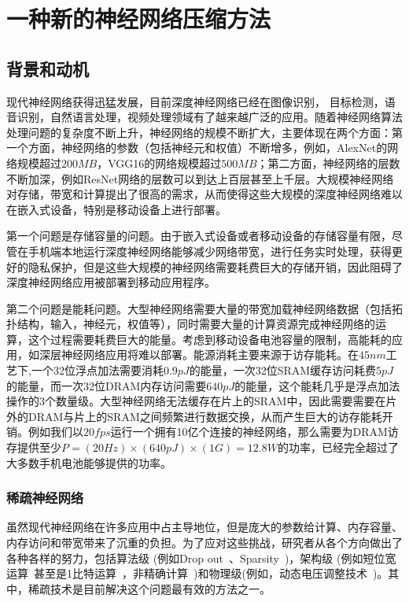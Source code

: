 \chapter{一种新的神经网络压缩方法}


\section{背景和动机}

现代神经网络获得迅猛发展，目前深度神经网络已经在图像识别， 目标检测，语音识别，自然语言处理，视频处理领域有了越来越广泛的应用。随着神经网络算法处理问题的复杂度不断上升，神经网络的规模不断扩大，主要体现在两个方面：第一个方面，神经网络的参数（包括神经元和权值）不断增多，例如，AlexNet的网络规模超过$200MB$，VGG16的网络规模超过$500MB$；第二方面，神经网络的层数不断加深，例如ResNet网络的层数可以到达上百层甚至上千层。大规模神经网络对存储，带宽和计算提出了很高的需求，从而使得这些大规模的深度神经网络难以在嵌入式设备，特别是移动设备上进行部署。

第一个问题是存储容量的问题。由于嵌入式设备或者移动设备的存储容量有限，尽管在手机端本地运行深度神经网络能够减少网络带宽，进行任务实时处理，获得更好的隐私保护，但是这些大规模的神经网络需要耗费巨大的存储开销，因此阻碍了深度神经网络应用被部署到移动应用程序。

第二个问题是能耗问题。大型神经网络需要大量的带宽加载神经网络数据（包括拓扑结构，输入，神经元，权值等），同时需要大量的计算资源完成神经网络的运算，这个过程需要耗费巨大的能量。考虑到移动设备电池容量的限制，高能耗的应用，如深层神经网络应用将难以部署。能源消耗主要来源于访存能耗。在$45nm$工艺下,一个32位浮点加法需要消耗$0.9pJ$的能量，一次32位SRAM缓存访问耗费$5pJ$的能量，而一次32位DRAM内存访问需要$640pJ$的能量，这个能耗几乎是浮点加法操作的3个数量级。大型神经网络无法缓存在片上的SRAM中，因此需要需要在片外的DRAM与片上的SRAM之间频繁进行数据交换，从而产生巨大的访存能耗开销。例如我们以$20fps$运行一个拥有10亿个连接的神经网络，那么需要为DRAM访存提供至少$P = (20Hz)\times (640pJ)\times (1G) = 12.8W$的功率，已经完全超过了大多数手机电池能够提供的功率。

\subsection{稀疏神经网络}
虽然现代神经网络在许多应用中占主导地位，但是庞大的参数给计算、内存容量、内存访问和带宽带来了沉重的负担。为了应对这些挑战，研究者从各个方向做出了各种各样的努力，包括算法级 (例如Drop out~\cite{srivastava2014dropout}、Sparsity~\cite{han2015learning})，架构级 (例如短位宽运算~\cite{holi1993finite}甚至是1比特运算~\cite{rastegari2016xnor}，非精确计算~\cite{venkataramani2014axnn})和物理级(例如，动态电压调整技术~\cite{pillai2001real})。其中，稀疏技术是目前解决这个问题最有效的方法之一。


